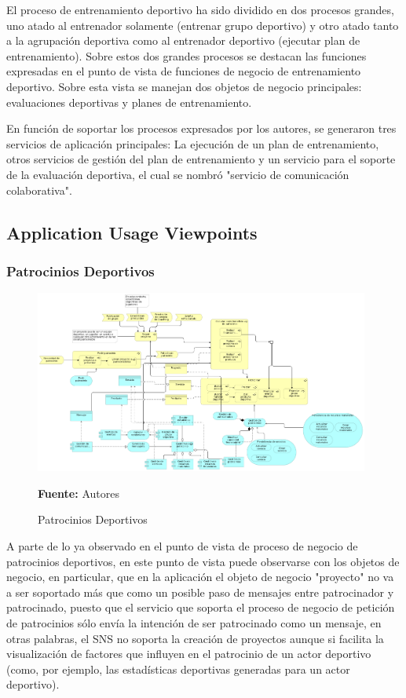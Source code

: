 El proceso de entrenamiento deportivo ha sido dividido en dos procesos grandes, uno atado al entrenador solamente (entrenar grupo deportivo) y otro atado tanto a la agrupación deportiva como al entrenador deportivo (ejecutar plan de entrenamiento). Sobre estos dos grandes procesos se destacan las funciones expresadas en el punto de vista de funciones de negocio de entrenamiento deportivo. Sobre esta vista se manejan dos objetos de negocio principales: evaluaciones deportivas y planes de entrenamiento.

En función de soportar los procesos expresados por los autores, se generaron tres servicios de aplicación principales: La ejecución de un plan de entrenamiento, otros servicios de gestión del plan de entrenamiento y un servicio para el soporte de la evaluación deportiva, el cual se nombró "servicio de comunicación colaborativa".

\subsection{Application Usage Viewpoints}

\subsubsection{Patrocinios Deportivos}

\begin{figure}[!htb]
  \begin{center}
    \includegraphics[width=11cm]{./imagenes/application_usage/patrociniosdeportivos.png}
    \caption{Patrocinios Deportivos}
    \label{fig:au_patrocinios_deportivos}
    \textbf{Fuente:}  Autores
  \end{center}
\end{figure}

A parte de lo ya observado en el punto de vista de proceso de negocio de patrocinios deportivos, en este punto de vista puede observarse con los objetos de negocio, en particular, que en la aplicación el objeto de negocio "proyecto" no va a ser soportado más que como un posible paso de mensajes entre patrocinador y patrocinado, puesto que el servicio que soporta el proceso de negocio de petición de patrocinios sólo envía la intención de ser patrocinado como un mensaje, en otras palabras, el SNS no soporta la creación de proyectos aunque si facilita la visualización de factores que influyen en el patrocinio de un actor deportivo (como, por ejemplo, las estadísticas deportivas generadas para un actor deportivo).

